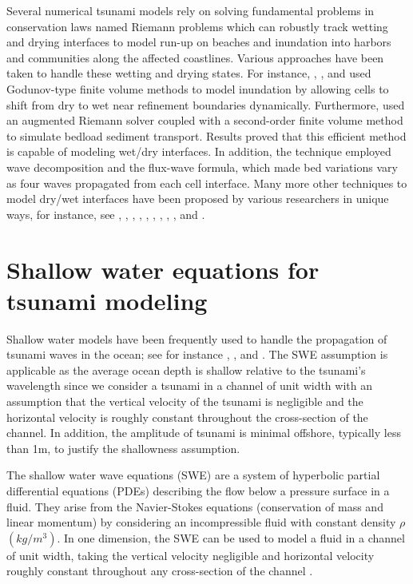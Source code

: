 \documentclass[9pt,a4paper]{article}
\begin{document}
	Several numerical tsunami models rely on solving fundamental problems in conservation laws named Riemann problems which can robustly track wetting and drying interfaces to model run-up on beaches and inundation into harbors and communities along the affected coastlines.  Various approaches have been taken to handle these wetting and drying states. For instance,   \citet{ge:2011}, \citet{li-ta-wa-ca-ba-ch-li:2021}, and \citet{fivser2016mass} used Godunov-type finite volume methods to model inundation by allowing cells to shift from dry to wet near refinement boundaries dynamically. Furthermore,   \citet{barzgaran2019numerical}  used an augmented Riemann solver coupled with a second-order finite volume method to simulate bedload sediment transport. Results proved that this efficient method is capable of modeling wet/dry interfaces.  In addition, the technique employed wave decomposition and the flux-wave formula, which made bed variations vary as four waves propagated from each cell interface. Many more other techniques to model dry/wet interfaces have been proposed by various researchers in unique ways, for instance, see   \citet{po:2015}, \citet{po:2018}, \citet{pe-bo-ma:2011}, \citet{toro2001shock}, \citet{chaabelasri1849simple}, \citet{nikolos2009unstructured}, \citet{huang2013well}, \citet{bi2014finite}, \citet{song2011unstructured}, and \citet{buttinger2019fast}.
	
	
	\section{Shallow water equations for tsunami modeling}
	\label{sec2}
	Shallow water models have been frequently used to handle the propagation of tsunami waves in the ocean; see for instance   \citet{dutykh2007water}, \citet{le-ge-be:2011}, and \citet{dias2007dynamics}. The SWE assumption is applicable as the average ocean depth is shallow relative to the tsunami's wavelength since we consider a tsunami in a channel of unit width with an assumption that the vertical velocity of the tsunami  is negligible and the horizontal velocity is roughly constant throughout the cross-section of the channel. In addition, the amplitude of tsunami is minimal offshore, typically less than 1m, to justify the shallowness assumption. 
	
	The shallow water wave equations (SWE) are a system of hyperbolic partial differential equations (PDEs) describing the flow below a pressure surface in a fluid. They arise from the Navier-Stokes equations (conservation of mass and linear momentum) by considering an incompressible fluid with constant density $\rho$ $(kg/m^{3})$.  In one dimension, the SWE  can be used to model a fluid in a channel of unit width, taking the vertical velocity negligible and horizontal velocity roughly constant throughout any cross-section of the channel \citep{ge:2008}.  
	
\end{document}
